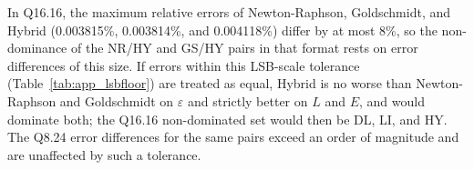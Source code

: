 \documentclass[manuscript,screen,review]{acmart}
\begin{document}
In Q16.16, the maximum relative errors of Newton-Raphson, Goldschmidt, and Hybrid (0.003815\%, 0.003814\%, and 0.004118\%) differ by at most 8\%, so the non-dominance of the NR/HY and GS/HY pairs in that format rests on error differences of this size. If errors within this LSB-scale tolerance (Table~\ref{tab:app_lsbfloor}) are treated as equal, Hybrid is no worse than Newton-Raphson and Goldschmidt on $\varepsilon$ and strictly better on $L$ and $E$, and would dominate both; the Q16.16 non-dominated set would then be DL, LI, and HY. The Q8.24 error differences for the same pairs exceed an order of magnitude and are unaffected by such a tolerance.
\end{document}
